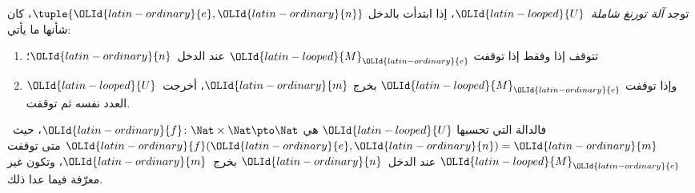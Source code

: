 \documentclass[../../../include/open-logic-section]{subfiles}
\begin{document}
\begin{thm}
توجد \emph{آلة تورنغ شاملة}~${\OLId{latin-looped}{U}}$، إذا ابتدأت بالدخل $\tuple{{\OLId{latin-ordinary}{e}},{\OLId{latin-ordinary}{n}}}$،
كان شأنها ما يأتي:
  \begin{enumerate}
    \item تتوقف إذا وفقط إذا توقفت ${\OLId{latin-looped}{M}}_{\OLId{latin-ordinary}{e}}$ عند الدخل~${\OLId{latin-ordinary}{n}}$؛
    \item وإذا توقفت ${\OLId{latin-looped}{M}}_{\OLId{latin-ordinary}{e}}$ بخرج ${\OLId{latin-ordinary}{m}}$، أخرجت~${\OLId{latin-looped}{U}}$ العدد نفسه ثم توقفت.
  \end{enumerate}
  فالدالة التي تحسبها ${\OLId{latin-looped}{U}}$ هي ${\OLId{latin-ordinary}{f}}\colon\Nat\times\Nat\pto\Nat$،
  حيث~${\OLId{latin-ordinary}{f}}({\OLId{latin-ordinary}{e}},{\OLId{latin-ordinary}{n}})={\OLId{latin-ordinary}{m}}$ متى توقفت ${\OLId{latin-looped}{M}}_{\OLId{latin-ordinary}{e}}$ عند الدخل~${\OLId{latin-ordinary}{n}}$ بخرج~${\OLId{latin-ordinary}{m}}$،
  وتكون غير معرّفة فيما عدا ذلك.
\end{thm}
\end{document}
